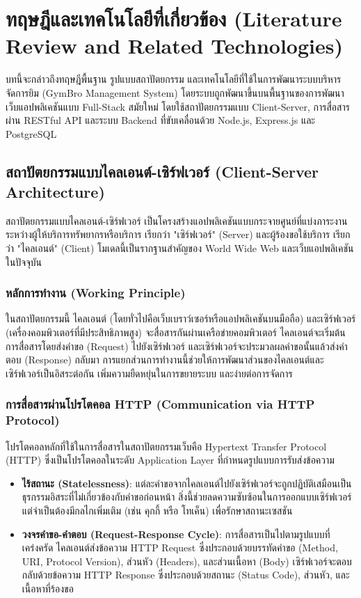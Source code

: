 \chapter{ทฤษฎีและเทคโนโลยีที่เกี่ยวข้อง (Literature Review and Related Technologies)}

บทนี้จะกล่าวถึงทฤษฎีพื้นฐาน รูปแบบสถาปัตยกรรม และเทคโนโลยีที่ใช้ในการพัฒนาระบบบริหารจัดการยิม (GymBro Management System) โดยระบบถูกพัฒนาขึ้นบนพื้นฐานของการพัฒนาเว็บแอปพลิเคชันแบบ Full-Stack สมัยใหม่ โดยใช้สถาปัตยกรรมแบบ Client-Server, การสื่อสารผ่าน RESTful API และระบบ Backend ที่ขับเคลื่อนด้วย Node.js, Express.js และ PostgreSQL

\section{สถาปัตยกรรมแบบไคลเอนต์-เซิร์ฟเวอร์ (Client-Server Architecture)}
สถาปัตยกรรมแบบไคลเอนต์-เซิร์ฟเวอร์ เป็นโครงสร้างแอปพลิเคชันแบบกระจายศูนย์ที่แบ่งภาระงานระหว่างผู้ให้บริการทรัพยากรหรือบริการ เรียกว่า "เซิร์ฟเวอร์" (Server) และผู้ร้องขอใช้บริการ เรียกว่า "ไคลเอนต์" (Client) โมเดลนี้เป็นรากฐานสำคัญของ World Wide Web และเว็บแอปพลิเคชันในปัจจุบัน

\subsection{หลักการทำงาน (Working Principle)}
ในสถาปัตยกรรมนี้ ไคลเอนต์ (โดยทั่วไปคือเว็บเบราว์เซอร์หรือแอปพลิเคชันบนมือถือ) และเซิร์ฟเวอร์ (เครื่องคอมพิวเตอร์ที่มีประสิทธิภาพสูง) จะสื่อสารกันผ่านเครือข่ายคอมพิวเตอร์ ไคลเอนต์จะเริ่มต้นการสื่อสารโดยส่งคำขอ (Request) ไปยังเซิร์ฟเวอร์ และเซิร์ฟเวอร์จะประมวลผลคำขอนั้นแล้วส่งคำตอบ (Response) กลับมา การแยกส่วนการทำงานนี้ช่วยให้การพัฒนาส่วนของไคลเอนต์และเซิร์ฟเวอร์เป็นอิสระต่อกัน เพิ่มความยืดหยุ่นในการขยายระบบ และง่ายต่อการจัดการ

\subsection{การสื่อสารผ่านโปรโตคอล HTTP (Communication via HTTP Protocol)}
โปรโตคอลหลักที่ใช้ในการสื่อสารในสถาปัตยกรรมเว็บคือ Hypertext Transfer Protocol (HTTP) ซึ่งเป็นโปรโตคอลในระดับ Application Layer ที่กำหนดรูปแบบการรับส่งข้อความ
\begin{itemize}
    \item \textbf{ไร้สถานะ (Statelessness)}: แต่ละคำขอจากไคลเอนต์ไปยังเซิร์ฟเวอร์จะถูกปฏิบัติเสมือนเป็นธุรกรรมอิสระที่ไม่เกี่ยวข้องกับคำขอก่อนหน้า สิ่งนี้ช่วยลดความซับซ้อนในการออกแบบเซิร์ฟเวอร์ แต่จำเป็นต้องมีกลไกเพิ่มเติม (เช่น คุกกี้ หรือ โทเค็น) เพื่อรักษาสถานะเซสชัน
    \item \textbf{วงจรคำขอ-คำตอบ (Request-Response Cycle)}: การสื่อสารเป็นไปตามรูปแบบที่เคร่งครัด ไคลเอนต์ส่งข้อความ HTTP Request ซึ่งประกอบด้วยบรรทัดคำขอ (Method, URI, Protocol Version), ส่วนหัว (Headers), และส่วนเนื้อหา (Body) เซิร์ฟเวอร์จะตอบกลับด้วยข้อความ HTTP Response ซึ่งประกอบด้วยสถานะ (Status Code), ส่วนหัว, และเนื้อหาที่ร้องขอ
\end{itemize}

